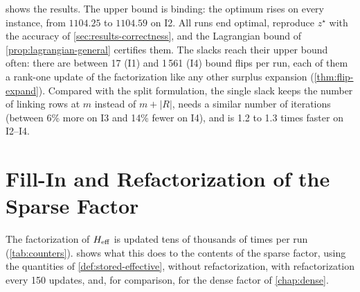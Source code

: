  shows the results. The upper bound is binding: the optimum rises on every
instance, from $1104.25$ to $1104.59$ on I2. All runs end optimal, reproduce $z^\star$ with the
accuracy of \cref{sec:results-correctness}, and the Lagrangian bound of
\cref{prop:lagrangian-general} certifies them. The slacks reach their upper bound often:
there are between 17 (I1) and 1\,561 (I4) bound flips per run, each of them a rank-one update
of the factorization like any other surplus expansion (\cref{thm:flip-expand}). Compared with
the split formulation, the single slack keeps the number of linking rows at $m$ instead of
$m + |R|$, needs a similar number of iterations (between 6\% more on I3 and 14\% fewer on
I4), and is 1.2 to 1.3 times faster on I2--I4.


\section{Fill-In and Refactorization of the Sparse Factor}
\label{sec:results-fill}

The factorization of $H_{\mathrm{eff}}$ is updated tens of thousands of times per run
(\cref{tab:counters}).  shows what this does to the contents of the sparse
factor, using the quantities of \cref{def:stored-effective}, without refactorization, with
refactorization every 150 updates, and, for comparison, for the dense factor of
\cref{chap:dense}.

